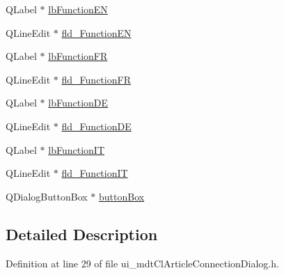 \begin{DoxyCompactItemize}
\item 
Q\-Label $\ast$ \hyperlink{class_ui__mdt_cl_article_connection_dialog_a6bb4e8f98dce0a2689f6411664132168}{lb\-Function\-E\-N}
\item 
Q\-Line\-Edit $\ast$ \hyperlink{class_ui__mdt_cl_article_connection_dialog_acd520706fcd867df18a357c1ad785e9f}{fld\-\_\-\-Function\-E\-N}
\item 
Q\-Label $\ast$ \hyperlink{class_ui__mdt_cl_article_connection_dialog_aa2d977b6c77e6a707dfdd4a6fbf301de}{lb\-Function\-F\-R}
\item 
Q\-Line\-Edit $\ast$ \hyperlink{class_ui__mdt_cl_article_connection_dialog_a12c1d1a957e06aa460c25a1abba1b882}{fld\-\_\-\-Function\-F\-R}
\item 
Q\-Label $\ast$ \hyperlink{class_ui__mdt_cl_article_connection_dialog_a7fa5f9f350509341df4b915348019b71}{lb\-Function\-D\-E}
\item 
Q\-Line\-Edit $\ast$ \hyperlink{class_ui__mdt_cl_article_connection_dialog_af060d49fa80c8ed5b05f8fe753d16eab}{fld\-\_\-\-Function\-D\-E}
\item 
Q\-Label $\ast$ \hyperlink{class_ui__mdt_cl_article_connection_dialog_a1274e56a32c9a61f93e920b09b7bd3f7}{lb\-Function\-I\-T}
\item 
Q\-Line\-Edit $\ast$ \hyperlink{class_ui__mdt_cl_article_connection_dialog_aaef09bb06e456b8a282362ff111a657c}{fld\-\_\-\-Function\-I\-T}
\item 
Q\-Dialog\-Button\-Box $\ast$ \hyperlink{class_ui__mdt_cl_article_connection_dialog_a3276f2d3e88acbf806c566f9c534467f}{button\-Box}
\end{DoxyCompactItemize}


\subsection{Detailed Description}


Definition at line 29 of file ui\-\_\-mdt\-Cl\-Article\-Connection\-Dialog.\-h.



